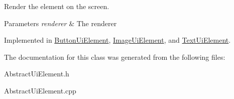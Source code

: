 Render the element on the screen. 


\begin{DoxyParams}{Parameters}
{\em renderer} & The renderer\\
\hline
\end{DoxyParams}


Implemented in \mbox{\hyperlink{class_button_ui_element_ad97fc68e9279a36182c66b07dfa28817}{Button\+Ui\+Element}}, \mbox{\hyperlink{class_image_ui_element_af0928d725565618d6a9c8a2f557c1709}{Image\+Ui\+Element}}, and \mbox{\hyperlink{class_text_ui_element_a636883070224511baea505f4ad4655d9}{Text\+Ui\+Element}}.



The documentation for this class was generated from the following files\+:\begin{DoxyCompactItemize}
\item 
Abstract\+Ui\+Element.\+h\item 
Abstract\+Ui\+Element.\+cpp\end{DoxyCompactItemize}
